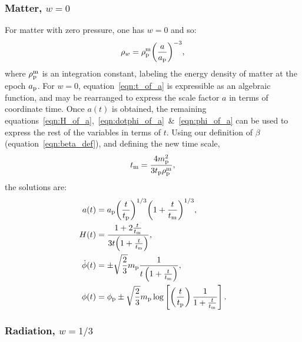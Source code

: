 \subsubsection{Matter, \(w=0\)}
For matter with zero pressure, one has \(w=0\) and so:
%
\begin{equation}
  \rho_w = \rho_{\mathrm{p}}^{\mathrm{m}}{\left(\frac{a}{a_{\mathrm{p}}}\right)}^{-3},
\end{equation}
%
where \(\rho_{\mathrm{p}}^{\mathrm{m}}\) is an integration constant, labeling the energy density of matter at the epoch \(a_{\mathrm{p}}\).  For \(w=0\), equation~\eqref{eqn:t_of_a} is expressible as an algebraic function, and may be rearranged to express the scale factor \(a\) in terms of coordinate time. Once \(a(t)\) is obtained, the remaining equations~\eqref{eqn:H_of_a},~\eqref{eqn:dotphi_of_a}~\&~\eqref{eqn:phi_of_a} can be used to express the rest of the variables in terms of \(t\). Using our definition of \(\beta\) (equation~\ref{eqn:beta_def}), and defining the new time scale,
%
\begin{equation}
  t_{\mathrm{m}} = \frac{4m_{\mathrm{p}}^2}{3t_{\mathrm{p}}\rho_{\mathrm{p}}^{\mathrm{m}} },
  \label{eqn:tm}
\end{equation}
the solutions are:
%
\begin{align}
  a(t)
  &=
  a_{\mathrm{p}}{\left(\frac{t}{t_{\mathrm{p}}}\right)}^{1/3}
  {\left(1+\frac{t}{t_{\mathrm{m}}}\right)}^{1/3} ,
  \\
  H(t) &= 
  \frac{1+2\frac{t}{t_{\mathrm{m}}}}{3t{{\left( 1+\frac{t}{t_{\mathrm{m}}} \right) }}},
  \\
  \dot{\phi}(t) &= 
  \pm\sqrt{\frac{2}{3}}m_{\mathrm{p}}
  \frac{1}
  {t \left( 1+\frac{t}{t_{\mathrm{m}}} \right) },
  \\
  \phi(t) &=
  \phi_{\mathrm{p}} \pm \sqrt{\frac{2}{3}}m_{\mathrm{p}} \log\left[  
  \left(\frac{t}{t_{\mathrm{p}}}\right) 
  \frac {1}{1+\frac{t}{t_{\mathrm{m}}}}  
  \right].
\end{align}
%




\subsubsection{Radiation, \(w=1/3\)}

